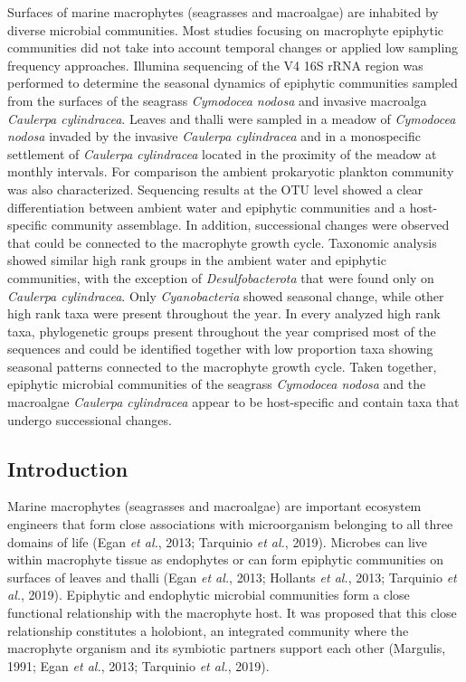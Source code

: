 \documentclass[12pt,]{article}
\begin{document}
Surfaces of marine macrophytes (seagrasses and macroalgae) are inhabited
by diverse microbial communities. Most studies focusing on macrophyte
epiphytic communities did not take into account temporal changes or
applied low sampling frequency approaches. Illumina sequencing of the V4
16S rRNA region was performed to determine the seasonal dynamics of
epiphytic communities sampled from the surfaces of the seagrass
\emph{Cymodocea nodosa} and invasive macroalga \emph{Caulerpa
cylindracea}. Leaves and thalli were sampled in a meadow of
\emph{Cymodocea nodosa} invaded by the invasive \emph{Caulerpa
cylindracea} and in a monospecific settlement of \emph{Caulerpa
cylindracea} located in the proximity of the meadow at monthly
intervals. For comparison the ambient prokaryotic plankton community was
also characterized. Sequencing results at the OTU level showed a clear
differentiation between ambient water and epiphytic communities and a
host-specific community assemblage. In addition, successional changes
were observed that could be connected to the macrophyte growth cycle.
Taxonomic analysis showed similar high rank groups in the ambient water
and epiphytic communities, with the exception of \emph{Desulfobacterota}
that were found only on \emph{Caulerpa cylindracea}. Only
\emph{Cyanobacteria} showed seasonal change, while other high rank taxa
were present throughout the year. In every analyzed high rank taxa,
phylogenetic groups present throughout the year comprised most of the
sequences and could be identified together with low proportion taxa
showing seasonal patterns connected to the macrophyte growth cycle.
Taken together, epiphytic microbial communities of the seagrass
\emph{Cymodocea nodosa} and the macroalgae \emph{Caulerpa cylindracea}
appear to be host-specific and contain taxa that undergo successional
changes.

\newpage

\hypertarget{introduction}{%
\subsection{Introduction}\label{introduction}}

Marine macrophytes (seagrasses and macroalgae) are important ecosystem
engineers that form close associations with microorganism belonging to
all three domains of life (Egan \emph{et al.}, 2013; Tarquinio \emph{et
al.}, 2019). Microbes can live within macrophyte tissue as endophytes or
can form epiphytic communities on surfaces of leaves and thalli (Egan
\emph{et al.}, 2013; Hollants \emph{et al.}, 2013; Tarquinio \emph{et
al.}, 2019). Epiphytic and endophytic microbial communities form a close
functional relationship with the macrophyte host. It was proposed that
this close relationship constitutes a holobiont, an integrated community
where the macrophyte organism and its symbiotic partners support each
other (Margulis, 1991; Egan \emph{et al.}, 2013; Tarquinio \emph{et
al.}, 2019).
\end{document}
